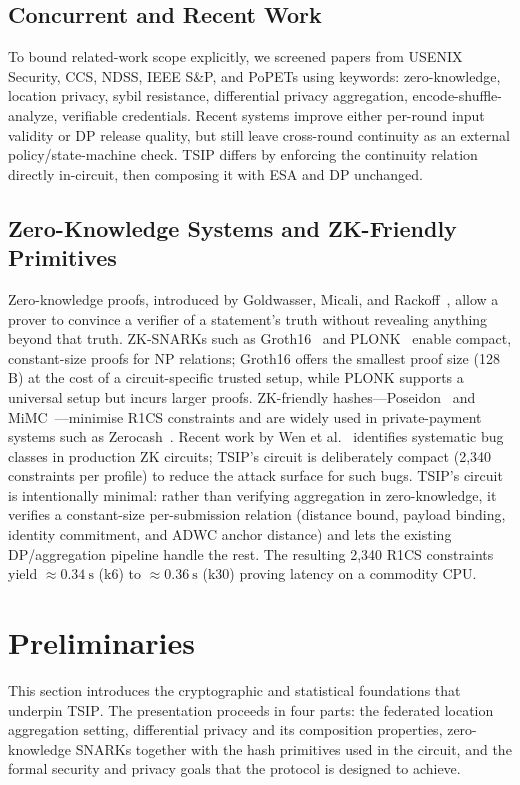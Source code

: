 \documentclass[conference]{IEEEtran}
\theoremstyle{definition}
\theoremstyle{plain}
\begin{document}
\subsection{Concurrent and Recent Work}

To bound related-work scope explicitly, we screened papers from
USENIX Security, CCS, NDSS,
IEEE S\&P, and PoPETs using keywords:
zero-knowledge, location privacy, sybil resistance, differential privacy aggregation,
 encode-shuffle-analyze, verifiable credentials.
 Recent systems improve either
per-round input validity or DP release quality, but still leave
cross-round continuity as an external policy/state-machine check.
\textsc{TSIP} differs by enforcing the continuity
relation directly in-circuit, then composing it with ESA and DP unchanged.

\subsection{Zero-Knowledge Systems and ZK-Friendly Primitives}

Zero-knowledge proofs, introduced by Goldwasser, Micali, and
Rackoff~\cite{Goldwasser1989ZK}, allow a prover to convince a verifier
of a statement's truth without revealing anything beyond that truth.
ZK-SNARKs such as Groth16~\cite{Groth2016pairing} and
PLONK~\cite{Gabizon2019PLONK} enable compact, constant-size proofs for
NP relations; Groth16 offers the smallest proof size (128\,B) at the
cost of a circuit-specific trusted setup, while PLONK supports a
universal setup but incurs larger proofs.
ZK-friendly hashes---Poseidon~\cite{Grassi2021Poseidon} and
MiMC~\cite{Albrecht2016MiMC}---minimise R1CS constraints and are widely
used in private-payment systems such as Zerocash~\cite{Sasson2014Zerocash}.
Recent work by Wen et al.~\cite{Wen2024ZKCircuit} identifies systematic
bug classes in production ZK circuits; \textsc{TSIP}'s circuit is
deliberately compact (2{,}340 constraints per profile) to reduce the
attack surface for such bugs.
\textsc{TSIP}'s circuit is intentionally minimal: rather than verifying
aggregation in zero-knowledge, it verifies a constant-size per-submission
relation (distance bound, payload binding, identity commitment, and ADWC
anchor distance) and lets the existing DP/aggregation pipeline handle the
rest. The resulting 2{,}340 R1CS constraints yield
$\approx\SI{0.34}{\second}$ (k6) to $\approx\SI{0.36}{\second}$ (k30)
proving latency on a commodity CPU.
\section{Preliminaries}\label{sec:prelim}
This section introduces the cryptographic and statistical foundations
that underpin \textsc{TSIP}.
The presentation proceeds in four parts: the federated location
aggregation setting, differential privacy and its composition properties,
zero-knowledge SNARKs together with the hash primitives used in the
circuit, and the formal security and privacy goals that the protocol
is designed to achieve.
\end{document}
